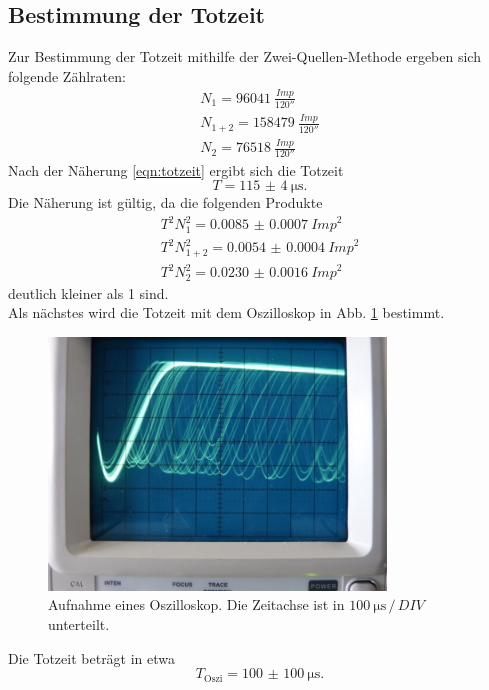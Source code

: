 \subsection{Bestimmung der Totzeit}
\label{sec:totzeit}
Zur Bestimmung der Totzeit mithilfe der Zwei-Quellen-Methode ergeben sich folgende Zählraten:
\begin{align*}
    N_1 = \SI{96041}{\frac{Imp}{120 \second}} \\
    N_{1+2} = \SI{158479}{\frac{Imp}{120 \second}} \\
    N_2 = \SI{76518}{\frac{Imp}{120 \second}}
\end{align*}
Nach der Näherung \eqref{eqn:totzeit} ergibt sich die Totzeit
\begin{equation}
    T = \SI{115(4)}{\micro\second} .
\end{equation}
Die Näherung ist gültig, da die folgenden Produkte
\begin{align*}
    T^2 N_1^2 = \SI{0.0085(7)}{{Imp}^2} \\
    T^2 N_{1+2}^2 = \SI{0.0054(4)}{{Imp}^2} \\
    T^2 N_2^2 = \SI{0.0230(16)}{{Imp}^2}
\end{align*}
deutlich kleiner als 1 sind.
\\
Als nächstes wird die Totzeit mit dem Oszilloskop in Abb. \ref{fig:oszi} bestimmt.
\begin{figure}
    \centering
    \includegraphics[width=0.8\textwidth]{content/data/oszi.jpg}
    \caption{Aufnahme eines Oszilloskop. Die Zeitachse ist in $\SI{100}{\micro\second \,/\, DIV}$ unterteilt. \cite[2]{hinweise}}
    \label{fig:oszi}
\end{figure}
Die Totzeit beträgt in etwa
\begin{equation}
    T_\text{Oszi} = \SI{100(100)}{\micro\second} .
\end{equation}
\FloatBarrier


